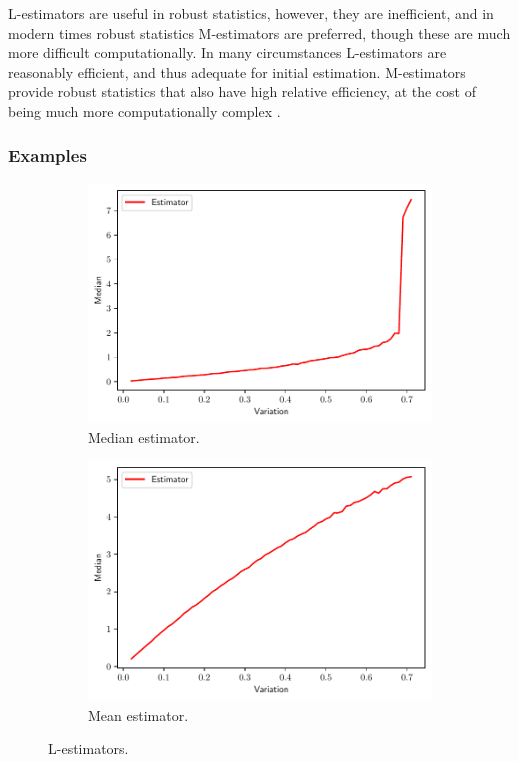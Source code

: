 \documentclass[11pt]{article}
\theoremstyle{definition}
\theoremstyle{remark}
\theoremstyle{remark}
\begin{document}
L-estimators are useful in robust statistics, however, they are
inefficient, and in modern times robust statistics M-estimators are
preferred, though these are much more difficult computationally. In
many circumstances L-estimators are reasonably efficient, and thus
adequate for initial estimation. M-estimators provide robust
statistics that also have high relative efficiency, at the cost of
being much more computationally complex \cite{andersen2008modern}.

\subsubsection*{Examples}

 \begin{figure}[H]
  \centering
  \begin{subfigure}[t]{0.475\textwidth}
      \centering
      \includegraphics[scale=0.40]{../figs/median.pdf}
      \caption{Median estimator.}
  \end{subfigure}
  \begin{subfigure}[t]{0.475\textwidth}
      \centering
      \includegraphics[scale=0.40]{../figs/mean-L.pdf}
      \caption{Mean estimator.}
  \end{subfigure}
  \caption{L-estimators.}
  \label{fig:L-Estimators_1}
\end{figure}
\end{document}
